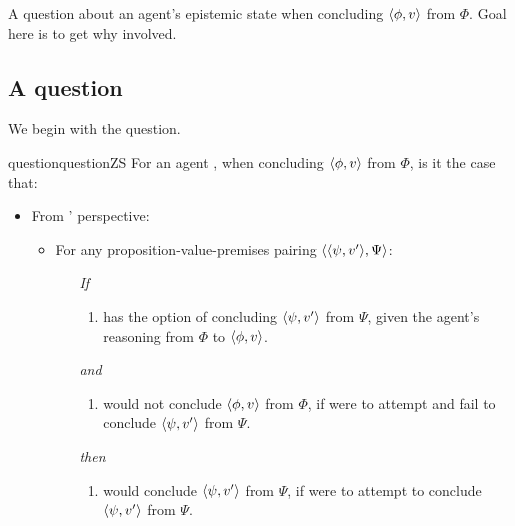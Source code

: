 \begin{note}
  A question about an agent's epistemic state when concluding \(\langle \phi, v \rangle\) from \(\Phi\).
  Goal here is to get why involved.
\end{note}

\subsection{A question}
\label{cha:zS:sec:the-question}

\begin{note}
  We begin with the question.

  \begin{restatable}[\qzS{}]{question}{questionZS}
    \label{question:zs}
    For an agent \vAgent{}, when concluding \(\langle \phi, v \rangle\) from \(\Phi\), is it the case that:

    \begin{itemize}
    \item
      From \vAgent{}' perspective:
      \begin{itemize}
      \item
        For any proposition-value-premises pairing \(\langle \langle \psi, v' \rangle, \Psi \rangle\):
        \begin{itemize}
        \item[\emph{If}]
          \begin{enumerate}[label=\alph*., ref=(\alph*)]
          \item
            \label{question:zs:option}
            \vAgent{} has the option of concluding \(\langle \psi, v' \rangle\) from \(\Psi\), given the agent's reasoning from \(\Phi\) to \(\langle \phi, v \rangle\).
          \end{enumerate}
        \item[\emph{and}]
          \begin{enumerate}[label=\alph*., ref=(\alph*), resume]
          \item
            \label{question:zs:subjunctive}
            \vAgent{} would not conclude \(\langle \phi, v \rangle\) from \(\Phi\), if \vAgent{} were to attempt and fail to conclude \(\langle \psi, v' \rangle\) from \(\Psi\).%
          \end{enumerate}
        \item[\emph{then}]
          \begin{enumerate}[label=\alph*., ref=(\alph*), resume]
          \item
            \label{question:zs:may-fail}
            \vAgent{} would conclude \(\langle \psi, v' \rangle\) from \(\Psi\), if \vAgent{} were to attempt to conclude \(\langle \psi, v' \rangle\) from \(\Psi\).
          \end{enumerate}
        \end{itemize}
      \end{itemize}
    \end{itemize}
    \vspace{-\baselineskip}
  \end{restatable}
\end{note}

